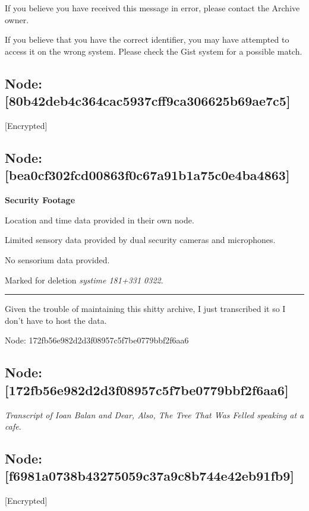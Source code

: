 If you believe you have received this message in error, please contact the Archive owner.

If you believe that you have the correct identifier, you may have attempted to access it on the wrong system. Please check the Gist system for a possible match.

\hypertarget{node-80b42deb4c364cac5937cff9ca306625b69ae7c5}{%
\subsection{Node: {[}80b42deb4c364cac5937cff9ca306625b69ae7c5{]}}\label{node-80b42deb4c364cac5937cff9ca306625b69ae7c5}}

{[}Encrypted{]}

\hypertarget{node-bea0cf302fcd00863f0c67a91b1a75c0e4ba4863}{%
\subsection{Node: {[}bea0cf302fcd00863f0c67a91b1a75c0e4ba4863{]}}\label{node-bea0cf302fcd00863f0c67a91b1a75c0e4ba4863}}

\textbf{Security Footage}

Location and time data provided in their own node.

Limited sensory data provided by dual security cameras and microphones.

No sensorium data provided.

Marked for deletion \emph{systime 181+331 0322}.

\begin{center}\rule{0.5\linewidth}{\linethickness}\end{center}

Given the trouble of maintaining this shitty archive, I just transcribed it so I don't have to host the data.

Node: 172fb56e982d2d3f08957c5f7be0779bbf2f6aa6

\hypertarget{node-172fb56e982d2d3f08957c5f7be0779bbf2f6aa6}{%
\subsection{Node: {[}172fb56e982d2d3f08957c5f7be0779bbf2f6aa6{]}}\label{node-172fb56e982d2d3f08957c5f7be0779bbf2f6aa6}}

\emph{Transcript of Ioan Balan and Dear, Also, The Tree That Was Felled speaking at a cafe.}

\hypertarget{node-f6981a0738b43275059c37a9c8b744e42eb91fb9}{%
\subsection{Node: {[}f6981a0738b43275059c37a9c8b744e42eb91fb9{]}}\label{node-f6981a0738b43275059c37a9c8b744e42eb91fb9}}

{[}Encrypted{]}
